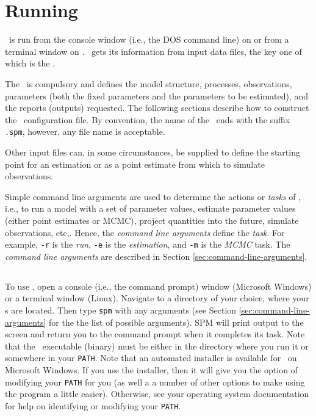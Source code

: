 \section{Running \SPM\label{sec:running-spm}}

\SPM\ is run from the console window (i.e., the DOS command line) on  or from a terminal window on . \SPM\ gets its information from input data files, the key one of which is the \config{}. 

The \config\ is compulsory and defines the model structure, processes, observations, parameters (both the fixed parameters and the parameters to be estimated), and the reports (outputs) requested. The following sections  describe how to construct the \SPM\ configuration file. By convention, the name of the \config\ ends with the suffix \texttt{.spm}, however, any file name is acceptable.

Other input files can, in some circumstances, be supplied to define the starting point for an estimation %
or as a point estimate from which to simulate observations.

Simple command line arguments are used to determine the actions or \emph{tasks} of \SPM, i.e., to run a model with a set of parameter values, estimate parameter values (either point estimates or MCMC), project quantities into the future, simulate observations, etc,. Hence, the \emph{command line arguments} define the \emph{task}. For example, \texttt{-r} is the \emph{run}, \texttt{-e} is the \emph{estimation}, and \texttt{-m} is the \emph{MCMC} task. The \emph{command line arguments} are described in Section \ref{sec:command-line-arguments}.

\subsection{}

To use \SPM, open a console (i.e., the command prompt) window (Microsoft Windows) or a terminal window (Linux). Navigate to a directory of your choice, where your \config s are located. Then type \texttt{spm} with any arguments (see Section \ref{sec:command-line-arguments} for the the list of possible arguments). SPM will print output to the screen and return you to the command prompt when it completes its task. Note that the \SPM\ executable (binary) must be either in the directory where you run it or somewhere in your \texttt{PATH}. Note that an automated installer is available for \SPM\ on Microsoft Windows. If you use the installer, then it will give you the option of modifying your \texttt{PATH} for you (as well a a number of other options to make using the program a little easier). Otherwise, see your operating system documentation for help on identifying or modifying your \texttt{PATH}.


